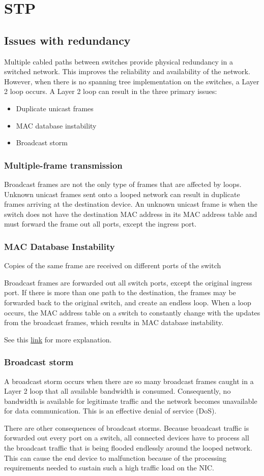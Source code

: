 \chapter{STP}
\section{Issues with redundancy}
Multiple cabled paths between switches provide physical redundancy in a switched network. This improves the reliability and availability of the network. However, when there is no spanning tree implementation on the switches, a Layer 2 loop occurs. A Layer 2 loop can result in the three primary issues:
\begin{itemize}
\item Duplicate unicast frames
\item MAC database instability
\item Broadcast storm
\end{itemize}
\subsection{Multiple-frame transmission}
Broadcast frames are not the only type of frames that are affected by loops. Unknown unicast frames sent onto a looped network can result in duplicate frames arriving at the destination device. An unknown unicast frame is when the switch does not have the destination MAC address in its MAC address table and must forward the frame out all ports, except the ingress port.
\subsection{MAC Database Instability}
Copies of the same frame are received on different ports of the switch \par 
Broadcast frames are forwarded out all switch ports, except the original ingress port. If there is more than one path to the destination, the frames may be forwarded back to the original switch, and create an endless loop. When a loop occurs, the MAC address table on a switch to constantly change with the updates from the broadcast frames, which results in MAC database instability. \par 
See this \href{https://ccnav6.com/s3/course/module2/2.1.1.2/2.1.1.2.html}{link} for more explanation.
\subsection{Broadcast storm}
A broadcast storm occurs when there are so many broadcast frames caught in a Layer 2 loop that all available bandwidth is consumed. Consequently, no bandwidth is available for legitimate traffic and the network becomes unavailable for data communication. This is an effective denial of service (DoS).\par 
There are other consequences of broadcast storms. Because broadcast traffic is forwarded out every port on a switch, all connected devices have to process all the broadcast traffic that is being flooded endlessly around the looped network. This can cause the end device to malfunction because of the processing requirements needed to sustain such a high traffic load on the NIC.

